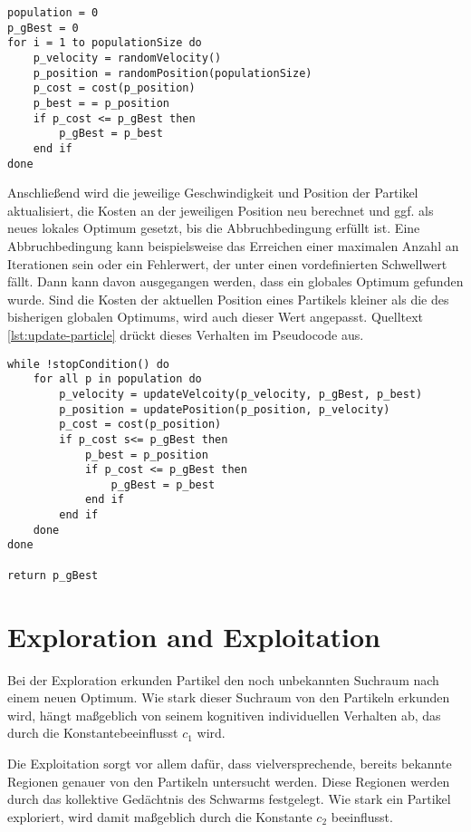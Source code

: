 \begin{lstlisting}[caption={Initialisierung der Parikel},
    label={lst:initialize-particle}]
population = 0
p_gBest = 0
for i = 1 to populationSize do
    p_velocity = randomVelocity()
    p_position = randomPosition(populationSize)
    p_cost = cost(p_position)
    p_best = = p_position
    if p_cost <= p_gBest then
        p_gBest = p_best
    end if
done
\end{lstlisting}

Anschließend wird die jeweilige Geschwindigkeit und Position der Partikel
aktualisiert, die Kosten an der jeweiligen Position neu berechnet und ggf. als
neues lokales Optimum gesetzt, bis die Abbruchbedingung erfüllt ist. Eine
Abbruchbedingung kann beispielsweise das Erreichen einer maximalen Anzahl an
Iterationen sein oder ein Fehlerwert, der unter einen vordefinierten
Schwellwert fällt. Dann kann davon ausgegangen werden, dass ein globales
Optimum gefunden wurde. Sind die Kosten der aktuellen Position eines
Partikels kleiner als die des bisherigen globalen Optimums, wird auch dieser
Wert angepasst. Quelltext \ref{lst:update-particle} drückt dieses Verhalten
im Pseudocode aus.

\begin{lstlisting}[caption={Aktualisierung der Partikel},
    label={lst:update-particle}]
while !stopCondition() do
    for all p in population do
        p_velocity = updateVelcoity(p_velocity, p_gBest, p_best)
        p_position = updatePosition(p_position, p_velocity)
        p_cost = cost(p_position)
        if p_cost s<= p_gBest then
            p_best = p_position
            if p_cost <= p_gBest then
                p_gBest = p_best
            end if
        end if
    done
done

return p_gBest
\end{lstlisting}

\section{Exploration and Exploitation}

Bei der Exploration erkunden Partikel den noch unbekannten Suchraum nach einem
neuen Optimum. Wie stark dieser Suchraum von den Partikeln erkunden wird, hängt
maßgeblich von seinem kognitiven individuellen Verhalten ab, das durch die
Konstantebeeinflusst $c_1$ wird.

Die Exploitation sorgt vor allem dafür, dass vielversprechende, bereits
bekannte Regionen genauer von den Partikeln untersucht werden. Diese Regionen
werden durch das kollektive Gedächtnis des Schwarms festgelegt. Wie stark ein
Partikel exploriert, wird damit maßgeblich durch die Konstante $c_2$
beeinflusst.

